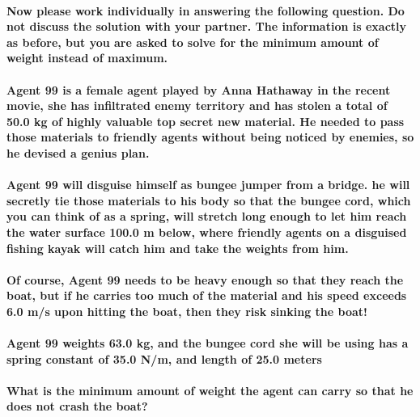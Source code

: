 \paragraph{Now please work individually in answering the following question. Do not discuss the solution with your partner. The information is exactly as before, but you are asked to solve for the minimum amount of weight instead of maximum.\newline}
\paragraph{Agent 99 is a female agent played by Anna Hathaway in the recent movie, she has infiltrated enemy territory and has stolen a total of 50.0 kg of highly valuable top secret new material. He needed to pass those materials to friendly agents without being noticed by enemies, so he devised a genius plan.\newline}
\paragraph{Agent 99 will disguise himself as bungee jumper from a bridge. he will secretly tie those materials to his body so that the bungee cord, which you can think of as a spring, will stretch long enough to let him reach the water surface 100.0 m below, where friendly agents on a disguised fishing kayak will catch him and take the weights from him.\newline}
\paragraph{Of course, Agent 99 needs to be heavy enough so that they reach the boat, but if he carries too much of the material and his speed exceeds 6.0 m/s upon hitting the boat, then they risk sinking the boat!\newline}
\paragraph{Agent 99 weights 63.0 kg, and the bungee cord she will be using has a spring constant of 35.0 N/m, and length of 25.0 meters\newline}
\paragraph{What is the minimum amount of weight the agent can carry so that he does not crash the boat?\newline}